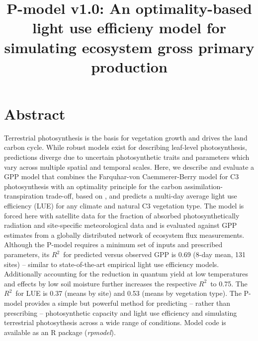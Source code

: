 \documentclass{myreport}
\newcommand{\rsq}{$R^2$}
\begin{document}
\pagestyle{headings}

% 

\title{P-model v1.0: An optimality-based light use efficieny model for simulating ecosystem gross primary production}

\maketitle

\tableofcontents

\section*{Abstract}

Terrestrial photosynthesis is the basis for vegetation growth and drives the land carbon cycle. %
While robust models exist for describing leaf-level photosynthesis, predictions diverge due to uncertain photosynthetic traits and parameters which vary across multiple spatial and temporal scales. Here, we describe and evaluate a GPP model that combines the Farquhar-von Caemmerer-Berry model for C3 photosynthesis with an optimality principle for the carbon assimilation-transpiration trade-off, based on \cite{wang17natpl}, and predicts a multi-day average light use efficiency (LUE) for any climate and natural C3 vegetation type. The model is forced here with satellite data for the fraction of absorbed photosynthetically radiation and site-specific meteorological data and is evaluated against GPP estimates from a globally distributed network of ecosystem flux measurements. Although the P-model requires a minimum set of inputs and prescribed parameters, its \rsq\ for predicted versus observed GPP is 0.69 (8-day mean, 131 sites) -- similar to state-of-the-art empirical light use efficiency models. Additionally accounting for the reduction in quantum yield at low temperatures and effects by low soil moisture further increases the respective \rsq\ to 0.75. The \rsq\ for LUE is 0.37 (means by site) and 0.53 (means by vegetation type). The P-model provides a simple but powerful method for predicting -- rather than prescribing -- photosynthetic capacity and light use efficiency and simulating terrestrial photosythesis across a wide range of conditions. Model code is available as an R package (\textit{rpmodel}).
\end{document}
